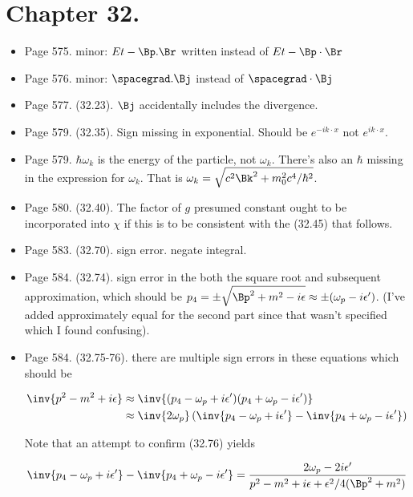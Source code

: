 \section{Chapter 32.}
\begin{itemize}
\item Page 575.  minor: $E t - \Bp . \Br$ written instead of $E t - \Bp \cdot \Br$
\item Page 576.  minor: $\spacegrad . \Bj$ instead of $\spacegrad \cdot \Bj$
\item Page 577.  (32.23).  $\Bj$ accidentally includes the divergence.
\item Page 579.  (32.35).  Sign missing in exponential.  Should be $e^{-i k \cdot x}$ not $e^{i k \cdot x}$.
\item Page 579.  $\hbar \omega_k$ is the energy of the particle, not $\omega_k$.  There's also an $\hbar$ missing in the expression for $\omega_k$.  That is $\omega_k = \sqrt{ c^2 \Bk^2 + m_0^2 c^4/\hbar^2}$.
\item Page 580.  (32.40).  The factor of $g$ presumed constant ought to be incorporated into $\chi$ if this is to be consistent with the (32.45) that follows.
\item Page 583.  (32.70).  sign error.  negate integral.
\item Page 584.  (32.74).  sign error in the both the square root and subsequent approximation, which should be $p_4 = \pm \sqrt{ \Bp^2 + m^2 - i \epsilon} \approx \pm (\omega_p - i \epsilon')$.  (I've added approximately equal for the second part since that wasn't specified which I found confusing).
\item Page 584.  (32.75-76).  there are multiple sign errors in these equations which should be

\begin{align*}
\inv{p^2 - m^2 + i\epsilon} 
&\approx \inv{
(p_4 - \omega_p + i\epsilon')
(p_4 + \omega_p - i\epsilon')
} \\
&\approx
\inv{2 \omega_p}\left(
\inv{p_4 - \omega_p + i\epsilon'}
-\inv{p_4 + \omega_p - i\epsilon'}
\right)
\end{align*}

Note that an attempt to confirm (32.76) yields

\begin{align*}
\inv{p_4 - \omega_p + i\epsilon'}
-\inv{p_4 + \omega_p - i\epsilon'}
=
\frac{2 \omega_p - 2 i \epsilon'}{ p^2 - m^2 + i \epsilon + \epsilon^2/4(\Bp^2 + m^2)}
\end{align*}


\end{itemize}

